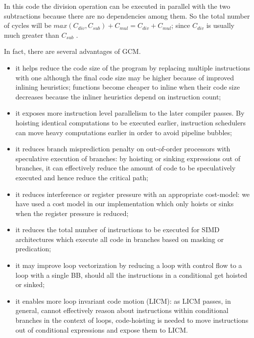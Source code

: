 \documentclass[acmlarge,review,anonymous]{acmart}\settopmatter{printfolios=true}
\begin{document}
In this code the division operation can be executed in parallel with the two
subtractions because there are no dependencies among them. So the total number
of cycles will be $max(C_{div}, C_{sub}) + C_{mul} = C_{div} + C_{mul}$; since
$C_{div}$ is usually much greater than $C_{sub}$ \cite{x86,aarch64}.


In fact, there are several advantages of GCM.
\begin{itemize}
\item it helps reduce the code size of the program by replacing multiple
  instructions with one although the final code size may be higher because of
  improved inlining heuristics; functions become cheaper to inline when their
  code size decreases because the inliner heuristics depend on instruction
  count;
\item it exposes more instruction level parallelism to the later compiler
  passes. By hoisting identical computations to be executed earlier, instruction
  schedulers can move heavy computations earlier in order to avoid pipeline
  bubbles;
\item it reduces branch misprediction penalty on out-of-order processors with
  speculative execution of branches: by hoisting or sinking expressions out of
  branches, it can effectively reduce the amount of code to be speculatively
  executed and hence reduce the critical path;
\item it reduces interference or register pressure with an appropriate
  cost-model: we have used a cost model in our implementation which only hoists
  or sinks when the register pressure is reduced;
\item it reduces the total number of instructions to be executed for SIMD
  architectures which execute all code in branches based on masking or
  predication;
\item it may improve loop vectorization by reducing a loop with control flow to
  a loop with a single BB, should all the instructions in a conditional get
  hoisted or sinked;
\item it enables more loop invariant code motion (LICM): as LICM passes, in
  general, cannot effectively reason about instructions within conditional
  branches in the context of loops, code-hoisting is needed to move instructions
  out of conditional expressions and expose them to LICM.
\end{itemize}
\end{document}
